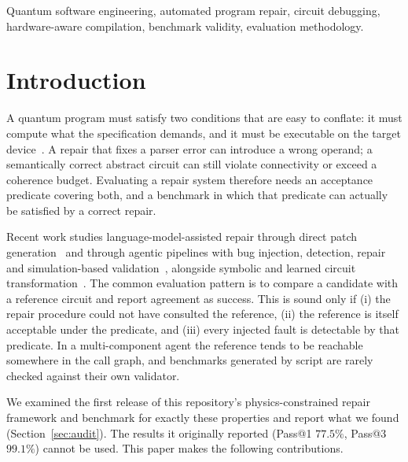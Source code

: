 \documentclass[journal]{IEEEtran}
\begin{document}
\begin{IEEEkeywords}
Quantum software engineering, automated program repair, circuit debugging,
hardware-aware compilation, benchmark validity, evaluation methodology.
\end{IEEEkeywords}

\section{Introduction}

A quantum program must satisfy two conditions that are easy to conflate: it must
compute what the specification demands, and it must be executable on the target
device~\cite{preskill2018nisq}. A repair that fixes a parser error can introduce
a wrong operand; a semantically correct abstract circuit can still violate
connectivity or exceed a coherence budget. Evaluating a repair system therefore
needs an acceptance predicate covering both, and a benchmark in which that
predicate can actually be satisfied by a correct repair.

Recent work studies language-model-assisted repair through direct patch
generation~\cite{guo2024chatgpt} and through agentic pipelines with bug
injection, detection, repair and simulation-based
validation~\cite{pham2026qbuglm}, alongside symbolic and learned circuit
transformation~\cite{duncan2020zx,kissinger2020pyzx,li2024quarl}. The common
evaluation pattern is to compare a candidate with a reference circuit and report
agreement as success. This is sound only if (i) the repair procedure could not
have consulted the reference, (ii) the reference is itself acceptable under the
predicate, and (iii) every injected fault is detectable by that predicate. In a
multi-component agent the reference tends to be reachable somewhere in the call
graph, and benchmarks generated by script are rarely checked against their own
validator.

We examined the first release of this repository's physics-constrained repair
framework and benchmark for exactly these properties and report what we found
(Section~\ref{sec:audit}). The results
it originally reported (Pass@1 $77.5\%$, Pass@3 $99.1\%$) cannot be used. This
paper makes the following contributions.
\end{document}
